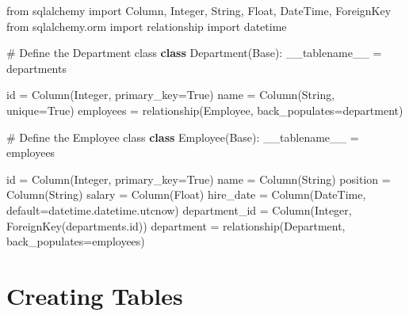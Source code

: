 \documentclass[
  letterpaper,
  DIV=11,
  numbers=noendperiod]{scrreprt}
\newenvironment{Shaded}{\begin{snugshade}}{\end{snugshade}}
\newcommand{\BuiltInTok}[1]{\textcolor[rgb]{0.00,0.23,0.31}{#1}}
\newcommand{\CommentTok}[1]{\textcolor[rgb]{0.37,0.37,0.37}{#1}}
\newcommand{\ImportTok}[1]{\textcolor[rgb]{0.00,0.46,0.62}{#1}}
\newcommand{\KeywordTok}[1]{\textcolor[rgb]{0.00,0.23,0.31}{\textbf{#1}}}
\newcommand{\NormalTok}[1]{\textcolor[rgb]{0.00,0.23,0.31}{#1}}
\newcommand{\OperatorTok}[1]{\textcolor[rgb]{0.37,0.37,0.37}{#1}}
\newcommand{\StringTok}[1]{\textcolor[rgb]{0.13,0.47,0.30}{#1}}
\newcommand{\VariableTok}[1]{\textcolor[rgb]{0.07,0.07,0.07}{#1}}
\begin{document}
\begin{Shaded}
\begin{Highlighting}[]
\ImportTok{from}\NormalTok{ sqlalchemy }\ImportTok{import}\NormalTok{ Column, Integer, String, Float, DateTime, ForeignKey}
\ImportTok{from}\NormalTok{ sqlalchemy.orm }\ImportTok{import}\NormalTok{ relationship}
\ImportTok{import}\NormalTok{ datetime}

\CommentTok{\# Define the Department class}
\KeywordTok{class}\NormalTok{ Department(Base):}
\NormalTok{    \_\_tablename\_\_ }\OperatorTok{=} \StringTok{\textquotesingle{}departments\textquotesingle{}}
    
    \BuiltInTok{id} \OperatorTok{=}\NormalTok{ Column(Integer, primary\_key}\OperatorTok{=}\VariableTok{True}\NormalTok{)}
\NormalTok{    name }\OperatorTok{=}\NormalTok{ Column(String, unique}\OperatorTok{=}\VariableTok{True}\NormalTok{)}
\NormalTok{    employees }\OperatorTok{=}\NormalTok{ relationship(}\StringTok{\textquotesingle{}Employee\textquotesingle{}}\NormalTok{, back\_populates}\OperatorTok{=}\StringTok{\textquotesingle{}department\textquotesingle{}}\NormalTok{)}

\CommentTok{\# Define the Employee class}
\KeywordTok{class}\NormalTok{ Employee(Base):}
\NormalTok{    \_\_tablename\_\_ }\OperatorTok{=} \StringTok{\textquotesingle{}employees\textquotesingle{}}
    
    \BuiltInTok{id} \OperatorTok{=}\NormalTok{ Column(Integer, primary\_key}\OperatorTok{=}\VariableTok{True}\NormalTok{)}
\NormalTok{    name }\OperatorTok{=}\NormalTok{ Column(String)}
\NormalTok{    position }\OperatorTok{=}\NormalTok{ Column(String)}
\NormalTok{    salary }\OperatorTok{=}\NormalTok{ Column(Float)}
\NormalTok{    hire\_date }\OperatorTok{=}\NormalTok{ Column(DateTime, default}\OperatorTok{=}\NormalTok{datetime.datetime.utcnow)}
\NormalTok{    department\_id }\OperatorTok{=}\NormalTok{ Column(Integer, ForeignKey(}\StringTok{\textquotesingle{}departments.id\textquotesingle{}}\NormalTok{))}
\NormalTok{    department }\OperatorTok{=}\NormalTok{ relationship(}\StringTok{\textquotesingle{}Department\textquotesingle{}}\NormalTok{, back\_populates}\OperatorTok{=}\StringTok{\textquotesingle{}employees\textquotesingle{}}\NormalTok{)}
\end{Highlighting}
\end{Shaded}

\section{Creating Tables}\label{creating-tables}
\end{document}
